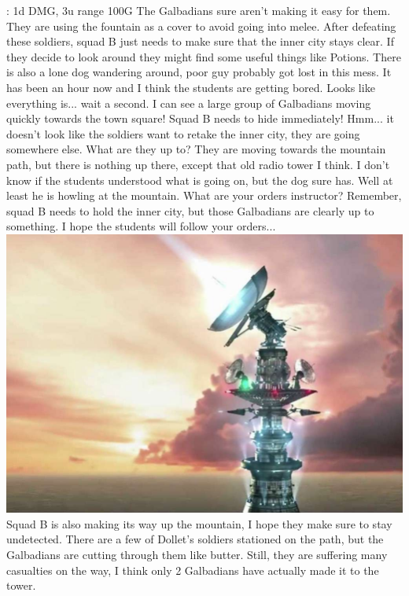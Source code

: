 {: 1d DMG, 3u range \hfill {} 100G}{}
%
\vfill
%
The Galbadians sure aren't making it easy for them.
They are using the fountain as a cover to avoid going into melee.  
After defeating these soldiers, squad B just needs to make sure that the inner city stays clear. 
If they decide to look around they might find some useful things like Potions.
There is also a lone dog wandering around, poor guy probably got lost in this mess.
It has been an hour now and I think the students are getting bored. 
Looks like everything is... wait a second.
I can see a large group of Galbadians moving quickly towards the town square!
Squad B needs to hide immediately! 
Hmm... it doesn't look like the soldiers want to retake the inner city, they are going somewhere else.
What are they up to?
%
\vfill
%
They are moving towards the mountain path, but there is nothing up there, except that old radio tower I think.
I don't know if the students understood what is going on, but the dog sure has.
Well at least he is howling at the mountain.
What are your orders instructor?
Remember, squad B needs to hold the inner city, but those Galbadians are clearly up to something.
I hope the students will follow your orders...
%
\clearpage
%
%
\vfill
%
\includegraphics[width=\columnwidth]{./art/siegeofdollet/tower.jpg}
%
\vfill
%
Squad B is also making its way up the mountain, I hope they make sure to stay undetected.
There are a few of Dollet's soldiers stationed on the path, but the Galbadians are cutting through them like butter.
Still, they are suffering many casualties on the way, I think only 2 Galbadians have actually made it to the tower.
